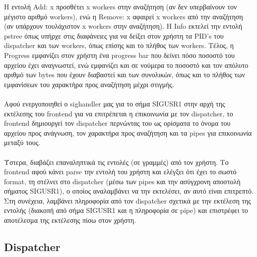 \documentclass{article}
\begin{document}
	\noindent Η εντολή Add: x προσθέτει x workers στην αναζήτηση (αν δεν υπερβαίνουν τον μέγιστο αριθμό workers), ενώ η Remove: x αφαιρεί x workers από την αναζήτηση (αν υπάρχουν τουλάχιστον x workers στην αναζήτηση). Η Info εκτελεί την εντολή pstree όπως υπήρχε στις διαφάνειες για να δείξει στον χρήστη τα PID's του dispatcher και των workers, όπως επίσης και το πλήθος των workers. Τέλος, η Progress εμφανίζει στον χρήστη ένα progress bar που δείνει πόσο ποσοστό του αρχείου έχει αναγνωστεί, ενώ εμφανίζει και σε νούμερα το ποσοστό και τον απόλυτο αριθμό των bytes που έχουν διαβαστεί και των συνολικών, όπως και το πλήθος των εμφανίσεων του χαρακτήρα προς αναζήτηση μέχρι στιγμής.\\ 
	\\
	Αφού ενεργοποιηθεί ο sighandler μας για το σήμα SIGUSR1 στην αρχή της εκτέλεσης του frontend για να επιτρέπεται η επικοινωνία με τον dispatcher, το frontend δημιουργεί τον dispatcher περνώντας του ως ορίσματα το όνομα του αρχείου προς ανάγνωση, τον χαρακτήρα προς αναζήτηση και τα pipes για επικοινωνία μεταξύ τους.\\
	\\
	Ύστερα, διαβάζει επαναληπτικά τις εντολές (σε γραμμές) από τον χρήστη. Το frontend αφού κάνει parse την εντολή του χρήστη και ελέγξει ότι έχει το σωστό format, τη στέλνει στο dispatcher (μέσω των pipes και την ασύγχρονη αποστολή σήματος SIGUSR1), ο οποίος αναλαμβάνει να την εκτελέσει, αν αυτό είναι επιτρεπτό. Στη συνέχεια, λαμβάνει πληροφορία από τον dispatcher σχετικά με την εκτέλεση της εντολής (διακοπή από σήμα SIGUSR1 και η πληροφορία σε pipe) και επιστρέφει το αποτέλεσμα της εκτέλεσης πίσω στον χρήστη.
	
	\subsection{Dispatcher}
	
\end{document}
